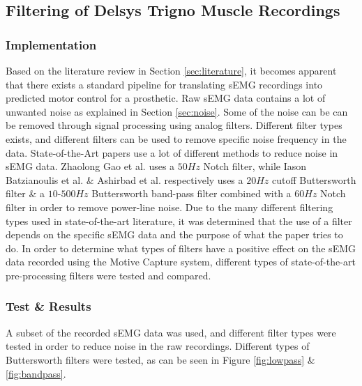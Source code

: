 \documentclass[../main.tex]{subfiles}
\begin{document}
\subsection{Filtering of Delsys Trigno Muscle Recordings}

\subsubsection{Implementation}

Based on the literature review in Section \ref{sec:literature}, it becomes apparent that there exists a standard pipeline for translating sEMG recordings into predicted motor control for a prosthetic.
Raw sEMG data contains a lot of unwanted noise as explained in Section \ref{sec:noise}.
Some of the noise can be can be removed through signal processing using analog filters.
Different filter types exists, and different filters can be used to remove specific noise frequency in the data. 
State-of-the-Art papers use a lot of different methods to reduce noise in sEMG data.
Zhaolong Gao et al. \cite{Zhaolong2021} uses a $50Hz$ Notch filter, while Iason Batzianoulis et al. \cite{Batzianoulis2018} \& Ashirbad et al. \cite{ashirbad2022} respectively uses a $20Hz$ cutoff Buttersworth filter \& a $10$-$500Hz$  Buttersworth band-pass filter combined with a $60Hz$ Notch filter in order to remove power-line noise.
Due to the many different filtering types used in state-of-the-art literature, it was determined that the use of a filter depends on the specific sEMG data and the purpose of what the paper tries to do.
In order to determine what types of filters have a positive effect on the sEMG data recorded using the Motive Capture system, different types of state-of-the-art pre-processing filters were tested and compared.


\subsubsection{Test \& Results}

A subset of the recorded sEMG data was used, and different filter types were tested in order to reduce noise in the raw recordings.
Different types of Buttersworth filters were tested, as can be seen in Figure \ref{fig:lowpass} \& \ref{fig:bandpass}.
\end{document}
